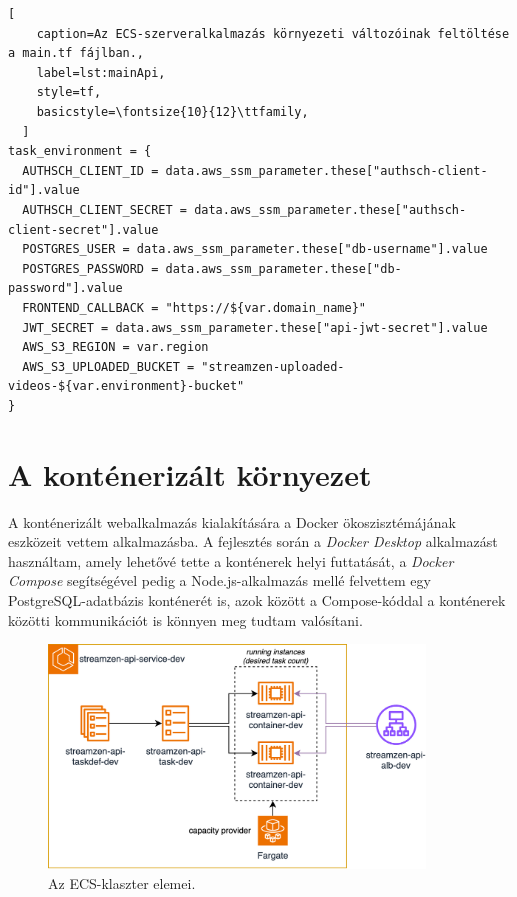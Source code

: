 \begin{minipage}{0.92\textwidth}
  \begin{lstlisting}[
    caption=Az ECS-szerveralkalmazás környezeti változóinak feltöltése a main.tf fájlban.,
    label=lst:mainApi,
    style=tf,
    basicstyle=\fontsize{10}{12}\ttfamily,
  ]
task_environment = {
  AUTHSCH_CLIENT_ID = data.aws_ssm_parameter.these["authsch-client-id"].value
  AUTHSCH_CLIENT_SECRET = data.aws_ssm_parameter.these["authsch-client-secret"].value
  POSTGRES_USER = data.aws_ssm_parameter.these["db-username"].value
  POSTGRES_PASSWORD = data.aws_ssm_parameter.these["db-password"].value
  FRONTEND_CALLBACK = "https://${var.domain_name}"
  JWT_SECRET = data.aws_ssm_parameter.these["api-jwt-secret"].value
  AWS_S3_REGION = var.region
  AWS_S3_UPLOADED_BUCKET = "streamzen-uploaded-videos-${var.environment}-bucket"
}
\end{lstlisting}
\end{minipage}

\section{A konténerizált környezet}

A konténerizált webalkalmazás kialakítására a Docker ökoszisztémájának eszközeit vettem alkalmazásba. A fejlesztés során a \emph{Docker Desktop} alkalmazást használtam, amely lehetővé tette a konténerek helyi futtatását, a \emph{Docker Compose} segítségével pedig a Node.js-alkalmazás mellé felvettem egy PostgreSQL-adatbázis konténerét is, azok között a Compose-kóddal a konténerek közötti kommunikációt is könnyen meg tudtam valósítani.

\begin{figure}[h]
  \centering
  \includegraphics[width=100mm, keepaspectratio]{figures/dipterv_ecs.png}
  \caption{Az ECS-klaszter elemei.}
  \label{fig:ecscluster}
\end{figure}

